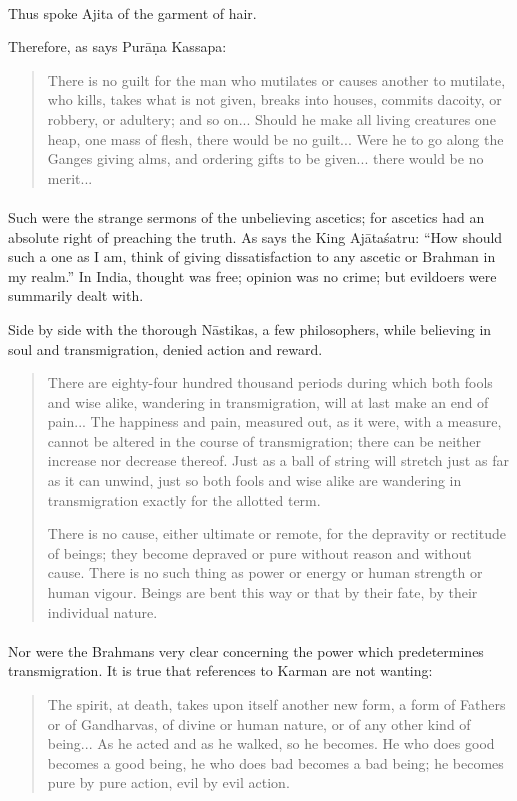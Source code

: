 \documentclass[a4paper, 11pt, oneside, english]{article}
\begin{document}
\paragraph{}
Thus spoke Ajita of the garment of hair.

Therefore, as says Purāṇa Kassapa:
\begin{quotation}
\small
There is no guilt for the man who mutilates or causes another to mutilate, who kills, takes what is not given, breaks into houses, commits dacoity, or robbery, or adultery; and so on... Should he make all living creatures one heap, one mass of flesh, there would be no guilt... Were he to go along the Ganges giving alms, and ordering gifts to be given... there would be no merit...
\end{quotation}
\paragraph{}
Such were the strange sermons of the unbelieving ascetics; for ascetics had an absolute right of preaching the truth. As says the King Ajātaśatru: ``How should such a one as I am, think of giving dissatisfaction to any ascetic or Brahman in my realm.'' In India, thought was free; opinion was no crime; but evildoers were summarily dealt with.

Side by side with the thorough Nāstikas, a few philosophers, while believing in soul and transmigration, denied action and reward.
\begin{quotation}
\small
There are eighty-four hundred thousand periods during which both fools and wise alike, wandering in transmigration, will at last make an end of pain... The happiness and pain, measured out, as it were, with a measure, cannot be altered in the course of transmigration; there can be neither increase nor decrease thereof. Just as a ball of string will stretch just as far as it can unwind, just so both fools and wise alike are wandering in transmigration exactly for the allotted term.

There is no cause, either ultimate or remote, for the depravity or rectitude of beings; they become depraved or pure without reason and without cause. There is no such thing as power or energy or human strength or human vigour. Beings are bent this way or that by their fate, by their individual nature.
\end{quotation}
\paragraph{}
Nor were the Brahmans very clear concerning the power which predetermines transmigration. It is true that references to Karman are not wanting:
\begin{quotation}
\small
The spirit, at death, takes upon itself another new form, a form of Fathers or of Gandharvas, of divine or human nature, or of any other kind of being... As he acted and as he walked, so he becomes. He who does good becomes a good being, he who does bad becomes a bad being; he becomes pure by pure action, evil by evil action.
\end{quotation}
\end{document}
